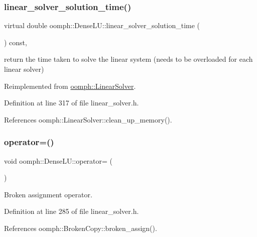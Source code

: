 \subsubsection{\texorpdfstring{linear\+\_\+solver\+\_\+solution\+\_\+time()}{linear\_solver\_solution\_time()}}
{\footnotesize\ttfamily virtual double oomph\+::\+Dense\+L\+U\+::linear\+\_\+solver\+\_\+solution\+\_\+time (\begin{DoxyParamCaption}{ }\end{DoxyParamCaption}) const\hspace{0.3cm}{\ttfamily [inline]}, {\ttfamily [virtual]}}



return the time taken to solve the linear system (needs to be overloaded for each linear solver) 



Reimplemented from \hyperlink{classoomph_1_1LinearSolver_a3c66f77db812a9c196478c7e2f77ef09}{oomph\+::\+Linear\+Solver}.



Definition at line 317 of file linear\+\_\+solver.\+h.



References oomph\+::\+Linear\+Solver\+::clean\+\_\+up\+\_\+memory().

\mbox{\label{classoomph_1_1DenseLU_a90c01b2a2471b4e038c6d5138c86c378}} 
\subsubsection{\texorpdfstring{operator=()}{operator=()}}
{\footnotesize\ttfamily void oomph\+::\+Dense\+L\+U\+::operator= (\begin{DoxyParamCaption}\item[{const \hyperlink{classoomph_1_1DenseLU}{Dense\+LU} \&}]{ }\end{DoxyParamCaption})\hspace{0.3cm}{\ttfamily [inline]}}



Broken assignment operator. 



Definition at line 285 of file linear\+\_\+solver.\+h.



References oomph\+::\+Broken\+Copy\+::broken\+\_\+assign().

